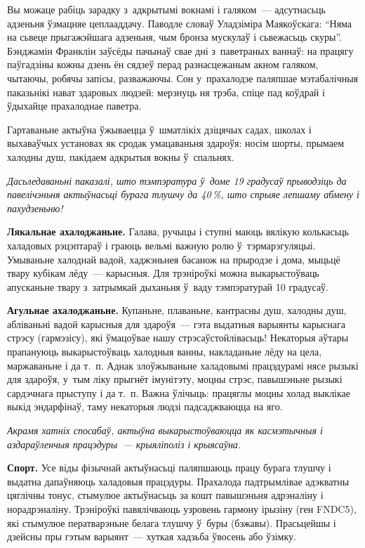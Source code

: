 Вы можаце рабіць зарадку з~адкрытымі вокнамі і галяком~--- адсутнасьць адзеньня ўзмацняе цеплааддачу. Паводле словаў Уладзіміра Маякоўскага: ``Няма на сьвеце прыгажэйшага адзеньня, чым бронза мускулаў і сьвежасьць скуры''. Бэнджамін Франклін заўсёды пачынаў свае дні з~паветраных ваннаў: на працягу паўгадзіны кожны дзень ён сядзеў перад разнасцежаным акном галяком, чытаючы, робячы запісы, разважаючы. Сон у~прахалодзе паляпшае мэтабалічныя паказьнікі нават здаровых людзей: мерзнуць ня трэба, спіце пад коўдрай і ўдыхайце прахалоднае паветра.

Гартаваньне актыўна ўжываецца ў~шматлікіх дзіцячых садах, школах і выхаваўчых установах як сродак умацаваньня здароўя: носім шорты, прымаем халодны душ, пакідаем адкрытыя вокны ў~спальнях.

\emph{Дасьледаваньні паказалі, што тэмпэратура ў~доме 19 градусаў прыводзіць да павелічэньня актыўнасьці бурага тлушчу да 40\,\%, што спрыяе лепшаму абмену і пахудзеньню!}

\textbf{Лякальнае ахалоджаньне.} Галава, ручыцы і ступні маюць вялікую колькасьць халадовых рэцэптараў і граюць вельмі важную ролю ў~тэрмарэгуляцыі. Умываньне халоднай вадой, хаджэньнея басанож на прыродзе і дома, мыцьцё твару кубікам лёду~--- карысныя. Для трэніроўкі можна выкарыстоўваць апусканьне твару з~затрымкай дыханьня ў~ваду тэмпэратурай 10 градусаў.

\textbf{Агульнае ахалоджаньне.} Купаньне, плаваньне, кантрасны душ, халодны душ, абліваньні вадой карысныя для здароўя~--- гэта выдатныя варыянты карыснага стрэсу (гармэзісу), які ўмацоўвае нашу стрэсаўстойлівасьць! Некаторыя аўтары прапануюць выкарыстоўваць халодныя ванны, накладаньне лёду на цела, маржаваньне і да т.~п. Аднак злоўжываньне халадовымі працэдурамі нясе рызыкі для здароўя, у~тым ліку прыгнёт імунітэту, моцны стрэс, павышэньне рызыкі сардэчнага прыступу і да т.~п. Важна ўлічыць: працяглы моцны холад выклікае выкід эндарфінаў, таму некаторыя людзі падсаджваюцца на яго.

\emph{Акрамя хатніх спосабаў, актыўна выкарыстоўваюцца як касмэтычныя і аздараўленчыя працэдуры~--- крыяліполіз і крыясаўна.}

\textbf{Спорт.} Усе віды фізычнай актыўнасьці паляпшаюць працу бурага тлушчу і выдатна дапаўняюць халадовыя працэдуры. Прахалода падтрымлівае адэкватны цяглічны тонус, стымулюе актыўнасьць за кошт павышэньня адрэналіну і норадрэналіну. Трэніроўкі павялічваюць узровень гармону ірызіну (ген FNDC5), які стымулюе ператварэньне белага тлушчу ў~буры (бэжавы). Прасьцейшы і дзейсны пры гэтым варыянт~--- хуткая хадзьба ўвосень або ўзімку.

